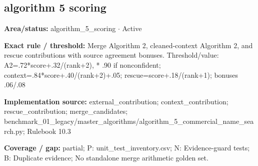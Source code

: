 \subsection*{algorithm 5 scoring}
\begin{tcolorbox}[enhanced,breakable,colback=white,colframe=Muted!45,boxrule=0.45pt,arc=1.5pt,left=6pt,right=6pt,top=5pt,bottom=5pt,title={\texttt{A5-MERGE-16}},title after break={\texttt{A5-MERGE-16}\ (continued)},fonttitle=\headingfont\bfseries\color{Navy},coltitle=Navy]
\textbf{Area/status:} algorithm\_\allowbreak{}5\_\allowbreak{}scoring $\boldsymbol{\cdot}$ Active\par
\smallskip
\textbf{Exact rule / threshold:} Merge Algorithm 2, cleaned-context Algorithm 2, and rescue contributions with source agreement bonuses. Threshold/\allowbreak{}value: A2=.72*score+.32/\allowbreak{}(rank+2), * .90 if nonconfident; context=.84*score+.40/\allowbreak{}(rank+2)+.05; rescue=score+.18/\allowbreak{}(rank+1); bonuses .06/\allowbreak{}.08\par
\smallskip
\textbf{Implementation source:} external\_\allowbreak{}contribution; context\_\allowbreak{}contribution; rescue\_\allowbreak{}contribution; merge\_\allowbreak{}candidates; benchmark\_\allowbreak{}01\_\allowbreak{}legacy/\allowbreak{}master\_\allowbreak{}algorithms/\allowbreak{}algorithm\_\allowbreak{}5\_\allowbreak{}commercial\_\allowbreak{}name\_\allowbreak{}search.py; Rulebook 10.3\par
\smallskip
\textbf{Coverage / gap:} partial; P: unit\_\allowbreak{}test\_\allowbreak{}inventory.csv; N: Evidence-guard tests; B: Duplicate evidence; No standalone merge arithmetic golden set.
\end{tcolorbox}
\medskip
